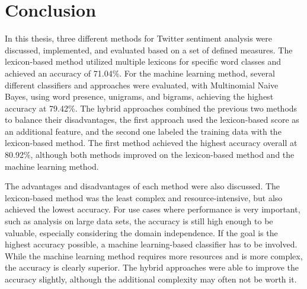 \chapter{Conclusion}
\label{cha:Chapter7_Conclusion}

\iffalse

Length: 1-2 pages

Effort: 1-2 days


Zusammenfassung der Ergebnisse, Ausblick --> was kann man noch machen, auf Ergebnisse aufbauen, weiterfuehrende Themen

Beim Erstellen der Arbeit --> nicht jeder Idee hinterherrennen, eher dann fuer Conclusion

Implementation source code --> muss nicht sein, kann auch ein link auf github sein

\fi

In this thesis, three different methods for Twitter sentiment analysis were discussed, implemented, and evaluated based on a set of defined measures. The lexicon-based method utilized multiple lexicons for specific word classes and achieved an accuracy of 71.04\%. For the machine learning method, several different classifiers and approaches were evaluated, with Multinomial Naive Bayes, using word presence, unigrams, and bigrams, achieving the highest accuracy at 79.42\%. The hybrid approaches combined the previous two methods to balance their disadvantages, the first approach used the lexicon-based score as an additional feature, and the second one labeled the training data with the lexicon-based method. The first method achieved the highest accuracy overall at 80.92\%, although both methods improved on the lexicon-based method and the machine learning method.

The advantages and disadvantages of each method were also discussed. The lexicon-based method was the least complex and resource-intensive, but also achieved the lowest accuracy. For use cases where performance is very important, such as analysis on large data sets, the accuracy is still high enough to be valuable, especially considering the domain independence. If the goal is the highest accuracy possible, a machine learning-based classifier has to be involved. While the machine learning method requires more resources and is more complex, the accuracy is clearly superior. The hybrid approaches were able to improve the accuracy slightly, although the additional complexity may often not be worth it.

